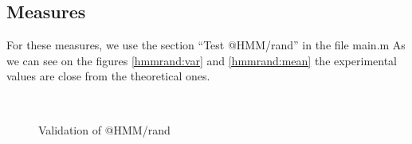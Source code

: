\documentclass[a4paper]{report}
\begin{document}
\subsection{Measures}
For these measures, we use the section ``Test @HMM/rand'' in the file main.m
As we can see on the figures \ref{hmmrand:var} and \ref{hmmrand:mean} the experimental values are close from the theoretical ones.
\begin{figure}[!h]
\centering
    \\
\captionsetup{justification=centering}
    \caption{Validation of @HMM/rand\\\color{blue}{Blue : Plot of the 20 attempts}\\\color{red}{Red : Mean over the 20 attempts}}
\end{figure}
\pagebreak
\end{document}
